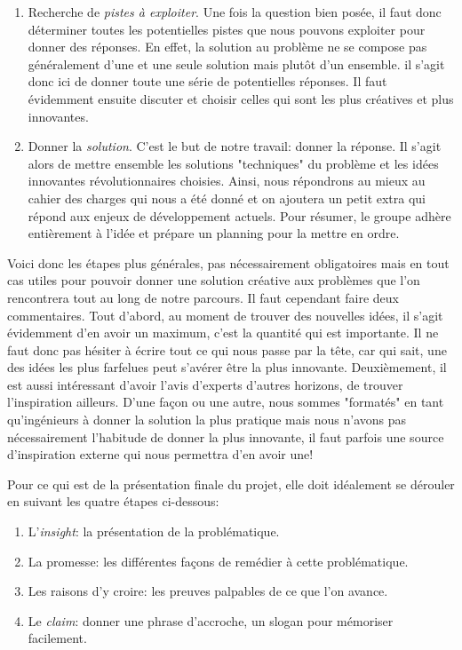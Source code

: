 \begin{enumerate}
\item Recherche de \textit{pistes à exploiter}. Une fois la question bien posée, il faut donc déterminer toutes les potentielles pistes que nous pouvons exploiter pour donner des réponses. En effet, la solution au problème ne se compose pas généralement d'une et une seule solution mais plutôt d'un ensemble. il s'agit donc ici de donner toute une série de potentielles réponses. Il faut évidemment ensuite discuter et choisir celles qui sont les plus créatives et plus innovantes.

\item Donner la \textit{solution}. C'est le but de notre travail: donner la réponse. Il s'agit alors de mettre ensemble les solutions "techniques" du problème et les idées innovantes révolutionnaires choisies. Ainsi, nous répondrons au mieux au cahier des charges qui nous a été donné et on ajoutera un petit extra qui répond aux enjeux de développement actuels. Pour résumer, le groupe adhère entièrement à l'idée et prépare un planning pour la mettre en ordre.

\end{enumerate}

Voici donc les étapes plus générales, pas nécessairement obligatoires mais en tout cas utiles pour pouvoir donner une solution créative aux problèmes que l'on rencontrera tout au long de notre parcours. Il faut cependant faire deux commentaires. Tout d'abord, au moment de trouver des nouvelles idées, il s’agit évidemment d'en avoir un maximum, c'est la quantité qui est importante. Il ne faut donc pas hésiter à écrire tout ce qui nous passe par la tête, car qui sait, une des idées les plus farfelues peut s’avérer être la plus innovante. Deuxièmement, il est aussi intéressant d'avoir l'avis d'experts d'autres horizons, de trouver l'inspiration ailleurs. D'une façon ou une autre, nous sommes "formatés" en tant qu’ingénieurs à donner la solution la plus pratique mais nous n'avons pas nécessairement l'habitude de donner la plus innovante, il faut parfois une source d'inspiration externe qui nous permettra d'en avoir une!

Pour ce qui est de la présentation finale du projet, elle doit idéalement se dérouler en suivant les quatre étapes ci-dessous:

\begin{enumerate}
\item L'\textit{insight}: la présentation de la problématique.
\item La promesse: les différentes façons de remédier à cette problématique.
\item Les raisons d’y croire: les preuves palpables de ce que l’on avance.
\item Le \textit{claim}: donner une phrase d’accroche, un slogan pour mémoriser facilement.
\end{enumerate}

